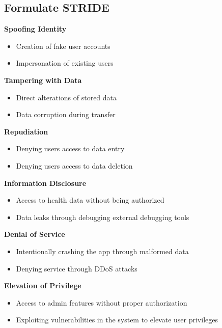 \subsection{Formulate STRIDE}
\textbf{Spoofing Identity}
\begin{itemize}
  \item Creation of fake user accounts
  \item Impersonation of existing users
\end{itemize}
\textbf{Tampering with Data}
\begin{itemize}
  \item Direct alterations of stored data
  \item Data corruption during transfer
\end{itemize}
\textbf{Repudiation}
\begin{itemize}
  \item Denying users access to data entry
  \item Denying users access to data deletion
\end{itemize}
\textbf{Information Disclosure}
\begin{itemize}
  \item Access to health data without being authorized
  \item Data leaks through debugging external debugging tools
\end{itemize}
\textbf{Denial of Service}
\begin{itemize}
  \item Intentionally crashing the app through malformed data
  \item Denying service through DDoS attacks
\end{itemize}
\textbf{Elevation of Privilege}
\begin{itemize}
  \item Access to admin features without proper authorization
  \item Exploiting vulnerabilities in the system to elevate user privileges
\end{itemize}

